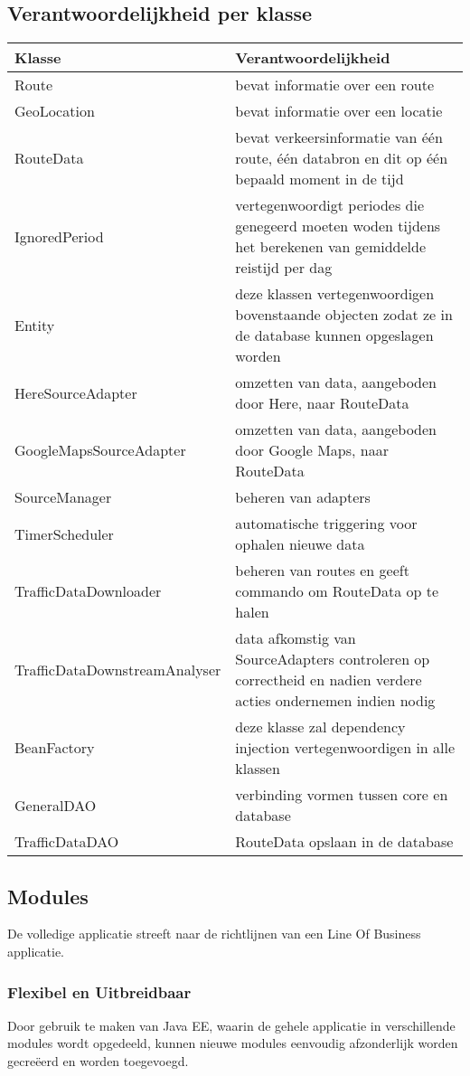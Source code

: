 \documentclass[ps,a4paper,oneside]{report}
\begin{document}
\subsection{Verantwoordelijkheid per klasse}
\begin{tabular}{ | l | p{6.5cm}| }
	\hline
	\textbf{Klasse} & \textbf{Verantwoordelijkheid} \\
	\hline
	Route & bevat informatie over een route \\
	\hline
	GeoLocation & bevat informatie over een locatie \\
	\hline
	RouteData & bevat verkeersinformatie van \'e\'en route, \'e\'en databron en dit op \'e\'en bepaald moment in de tijd \\
	\hline
	IgnoredPeriod & vertegenwoordigt periodes die genegeerd moeten woden tijdens het berekenen van gemiddelde reistijd per dag\\
	\hline
	[Object]Entity & deze klassen vertegenwoordigen bovenstaande objecten zodat ze in de database kunnen opgeslagen worden\\
	\hline
	HereSourceAdapter & omzetten van data, aangeboden door Here, naar RouteData\\	
	\hline
	GoogleMapsSourceAdapter & omzetten van data, aangeboden door Google Maps, naar RouteData\\	
	\hline
	SourceManager & beheren van adapters\\	
	\hline
	TimerScheduler & automatische triggering voor ophalen nieuwe data\\	
	\hline
	TrafficDataDownloader & beheren van routes en geeft commando om RouteData op te halen\\	
	\hline
	TrafficDataDownstreamAnalyser & data afkomstig van SourceAdapters controleren op correctheid en nadien verdere acties ondernemen indien nodig\\		
	\hline
	BeanFactory & deze klasse zal dependency injection vertegenwoordigen in alle klassen \\	
	\hline
	GeneralDAO & verbinding vormen tussen core en database\\	
	\hline
	TrafficDataDAO & RouteData opslaan in de database\\	
	\hline
\end{tabular}
\subsection{Modules}
De volledige applicatie streeft naar de richtlijnen van een Line Of Business applicatie. 
\subsubsection{Flexibel en Uitbreidbaar}
Door gebruik te maken van Java EE, waarin de gehele applicatie in verschillende modules wordt opgedeeld, kunnen nieuwe modules eenvoudig afzonderlijk worden gecre\"eerd en worden toegevoegd. 
\end{document}
